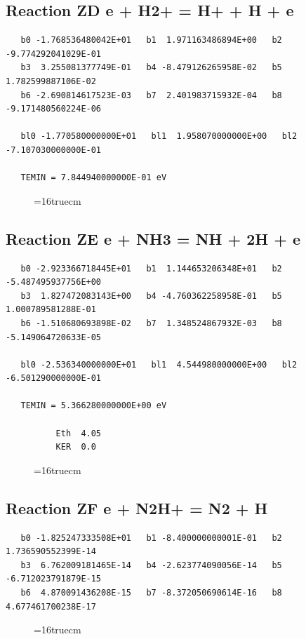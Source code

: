 \documentclass[12pt,dvipdfm]{article}
\begin{document}
\subsection{
Reaction ZD e + H2+ = H+ + H + e }
\begin{small}\begin{verbatim}
   b0 -1.768536480042E+01   b1  1.971163486894E+00   b2 -9.774292041029E-01
   b3  3.255081377749E-01   b4 -8.479126265958E-02   b5  1.782599887106E-02
   b6 -2.690814617523E-03   b7  2.401983715932E-04   b8 -9.171480560224E-06

   bl0 -1.770580000000E+01   bl1  1.958070000000E+00   bl2 -7.107030000000E-01

   TEMIN = 7.844940000000E-01 eV
\end{verbatim}\end{small}
\begin{figure}[h!] \label{n2rates}
\epsfxsize=16truecm
\end{figure}
\newpage

\subsection{
Reaction ZE e + NH3 = NH + 2H + e }
\begin{small}\begin{verbatim}
   b0 -2.923366718445E+01   b1  1.144653206348E+01   b2 -5.487495937756E+00
   b3  1.827472083143E+00   b4 -4.760362258958E-01   b5  1.000789581288E-01
   b6 -1.510680693898E-02   b7  1.348524867932E-03   b8 -5.149064720633E-05

   bl0 -2.536340000000E+01   bl1  4.544980000000E+00   bl2 -6.501290000000E-01

   TEMIN = 5.366280000000E+00 eV

          Eth  4.05
          KER  0.0
\end{verbatim}\end{small}
\begin{figure}[h!] \label{n2rates}
\epsfxsize=16truecm
\end{figure}
\newpage

\subsection{
Reaction ZF e + N2H+ = N2 + H }
\begin{small}\begin{verbatim}
   b0 -1.825247333508E+01   b1 -8.400000000001E-01   b2  1.736590552399E-14
   b3  6.762009181465E-14   b4 -2.623774090056E-14   b5 -6.712023791879E-15
   b6  4.870091436208E-15   b7 -8.372050690614E-16   b8  4.677461700238E-17
\end{verbatim}\end{small}
\begin{figure}[h!] \label{n2rates}
\epsfxsize=16truecm
\end{figure}
\newpage
\end{document}

